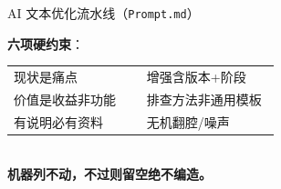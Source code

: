 \documentclass[aspectratio=169,UTF8]{beamer}
\begin{document}
\begin{frame}{AI 文本优化流水线（\texttt{Prompt.md}）}
  \vspace{0.15em}
  \begin{tcolorbox}[colback=green!8, colframe=green!50!black, boxrule=0.4pt, sharp corners, fontupper=\scriptsize]
  \textbf{六项硬约束}：\\[0.2em]
  \begin{tabular}{@{}p{0.48\linewidth}@{}p{0.48\linewidth}@{}}
    现状是痛点 & 增强含版本+阶段 \\
    价值是收益非功能 & 排查方法非通用模板 \\
    有说明必有资料 & 无机翻腔/噪声 \\
  \end{tabular}\\[0.2em]
  \textcolor{red!80!black}{\textbf{机器列不动，不过则留空绝不编造。}}
  \end{tcolorbox}
\end{frame}
\end{document}
